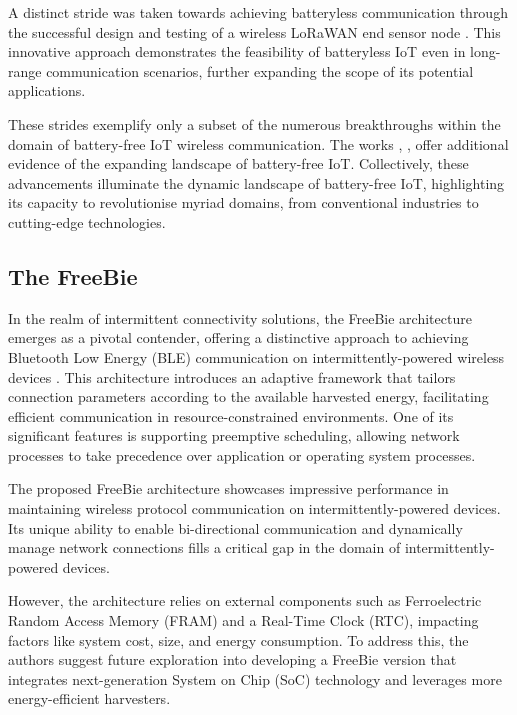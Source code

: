 \noindent A distinct stride was taken towards achieving batteryless communication through the successful design and testing of a wireless LoRaWAN end sensor node \cite{9299539}. This innovative approach demonstrates the feasibility of batteryless IoT even in long-range communication scenarios, further expanding the scope of its potential applications.

\noindent These strides exemplify only a subset of the numerous breakthroughs within the domain of battery-free IoT wireless communication. The works \cite{9718062}, \cite{10101211}, \cite{10.1145/3276774.3282823} offer additional evidence of the expanding landscape of battery-free IoT. Collectively, these advancements illuminate the dynamic landscape of battery-free IoT, highlighting its capacity to revolutionise myriad domains, from conventional industries to cutting-edge technologies.

\subsection{The FreeBie}
In the realm of intermittent connectivity solutions, the FreeBie architecture emerges as a pivotal contender, offering a distinctive approach to achieving Bluetooth Low Energy (BLE) communication on intermittently-powered wireless devices \cite{de2022Intermittently}. This architecture introduces an adaptive framework that tailors connection parameters according to the available harvested energy, facilitating efficient communication in resource-constrained environments. One of its significant features is supporting preemptive scheduling, allowing network processes to take precedence over application or operating system processes.

\noindent The proposed FreeBie architecture showcases impressive performance in maintaining wireless protocol communication on intermittently-powered devices. Its unique ability to enable bi-directional communication and dynamically manage network connections fills a critical gap in the domain of intermittently-powered devices.

\noindent However, the architecture relies on external components such as Ferroelectric Random Access Memory (FRAM) and a Real-Time Clock (RTC), impacting factors like system cost, size, and energy consumption. To address this, the authors suggest future exploration into developing a FreeBie version that integrates next-generation System on Chip (SoC) technology and leverages more energy-efficient harvesters.

